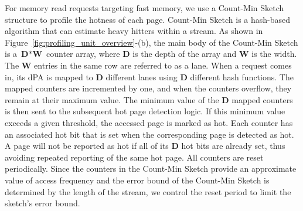
For memory read requests targeting fast memory, we use a Count-Min Sketch~\cite{count_min_sketch} structure to profile the hotness of each page. Count-Min Sketch is a hash-based algorithm that can estimate heavy hitters within a stream. As shown in Figure~\ref{fig:profiling_unit_overview}-(b), the main body of the Count-Min Sketch is a $\textbf{D}*\textbf{W}$ counter array, where $\textbf{D}$ is the depth of the array and $\textbf{W}$ is the width. The $\textbf{W}$ entries in the same row are referred to as a lane. When a request comes in, its dPA is mapped to $\textbf{D}$ different lanes using $\textbf{D}$ different hash functions. The mapped counters are incremented by one, and when the counters overflow, they remain at their maximum value. 
The minimum value of the $\textbf{D}$ mapped counters is then sent to the subsequent hot page detection logic. If this minimum value exceeds a given threshold, the accessed page is marked as hot.
Each counter has an associated hot bit that is set when the corresponding page is detected as hot. A page will not be reported as hot if all of its $\textbf{D}$ hot bits are already set, thus avoiding repeated reporting of the same hot page. All counters are reset periodically. Since the counters in the Count-Min Sketch provide an approximate value of access frequency and the error bound of the Count-Min Sketch is determined by the length of the stream, we control the reset period to limit the sketch's error bound.


